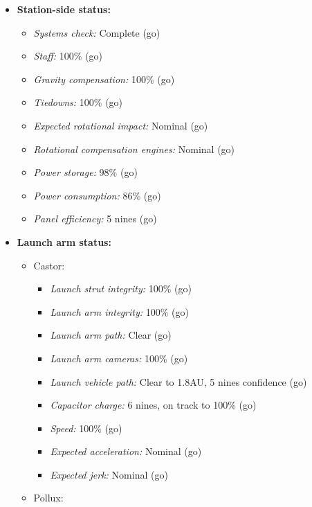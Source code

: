\begin{itemize}
\tightlist
\item
  \textbf{Station-side status:}

  \begin{itemize}
  \tightlist
  \item
    \emph{Systems check:} Complete (go)
  \item
    \emph{Staff:} 100\% (go)
  \item
    \emph{Gravity compensation:} 100\% (go)
  \item
    \emph{Tiedowns:} 100\% (go)
  \item
    \emph{Expected rotational impact:} Nominal (go)
  \item
    \emph{Rotational compensation engines:} Nominal (go)
  \item
    \emph{Power storage:} 98\% (go)
  \item
    \emph{Power consumption:} 86\% (go)
  \item
    \emph{Panel efficiency:} 5 nines (go)
  \end{itemize}
\item
  \textbf{Launch arm status:}

  \begin{itemize}
  \tightlist
  \item
    Castor:

    \begin{itemize}
    \tightlist
    \item
      \emph{Launch strut integrity:} 100\% (go)
    \item
      \emph{Launch arm integrity:} 100\% (go)
    \item
      \emph{Launch arm path:} Clear (go)
    \item
      \emph{Launch arm cameras:} 100\% (go)
    \item
      \emph{Launch vehicle path:} Clear to 1.8AU, 5 nines confidence (go)
    \item
      \emph{Capacitor charge:} 6 nines, on track to 100\% (go)
    \item
      \emph{Speed:} 100\% (go)
    \item
      \emph{Expected acceleration:} Nominal (go)
    \item
      \emph{Expected jerk:} Nominal (go)
    \end{itemize}
  \item
    Pollux:


\end{itemize}
\end{itemize}
